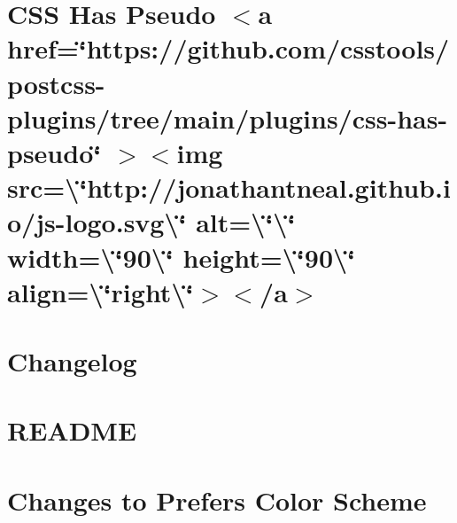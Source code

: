 \documentclass[twoside]{book}
\newcommand{\+}{\discretionary{\mbox{\scriptsize$\hookleftarrow$}}{}{}}
\begin{document}
\chapter{CSS Has Pseudo \texorpdfstring{$<$}{<}a href=\char`\"{}https\+://github.\+com/csstools/postcss-\/plugins/tree/main/plugins/css-\/has-\/pseudo\char`\"{} \texorpdfstring{$>$}{>}\texorpdfstring{$<$}{<}img src=\textbackslash{}\char`\"{}http\+://jonathantneal.\+github.\+io/js-\/logo.\+svg\textbackslash{}\char`\"{} alt=\textbackslash{}\char`\"{}\textbackslash{}\char`\"{} width=\textbackslash{}\char`\"{}90\textbackslash{}\char`\"{} height=\textbackslash{}\char`\"{}90\textbackslash{}\char`\"{} align=\textbackslash{}\char`\"{}right\textbackslash{}\char`\"{}\texorpdfstring{$>$}{>}\texorpdfstring{$<$}{<}/a\texorpdfstring{$>$}{>}}
\label{md__c___users_vaishnavi_jadhav__desktop__developer_code_mean_stack_example_client_node_modules_css_has_pseudo__r_e_a_d_m_e}

\chapter{Changelog}
\label{md__c___users_vaishnavi_jadhav__desktop__developer_code_mean_stack_example_client_node_modules_css_loader__c_h_a_n_g_e_l_o_g}

\chapter{README}
\label{md__c___users_vaishnavi_jadhav__desktop__developer_code_mean_stack_example_client_node_modules_css_loader__r_e_a_d_m_e}

\chapter{Changes to Prefers Color Scheme}
\label{md__c___users_vaishnavi_jadhav__desktop__developer_code_mean_stack_example_client_node_modules_c20f2c44878f91736e097a8587d78ca21}

\end{document}
